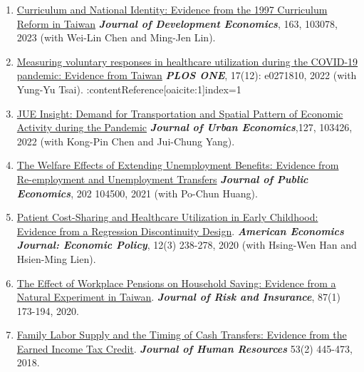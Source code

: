 \documentclass[10pt,letterpaper]{article}
\begin{document}
\begin{enumerate}
\item
\href{https://www.dropbox.com/s/lz3pqw0rozyn68r/knowing_taiwan_ver_2017_08_tzu_ting_v58.pdf?dl=0}{Curriculum and National Identity: Evidence from the 1997 Curriculum Reform in Taiwan} \textit{\textbf{Journal of Development Economics}}, 163, 103078, 2023 (with Wei-Lin Chen and Ming-Jen Lin).

\item
\href{https://doi.org/10.1371/journal.pone.0271810}{Measuring voluntary responses in healthcare utilization during the COVID-19 pandemic: Evidence from Taiwan}  \textit{\textbf{PLOS ONE}}, 17(12): e0271810, 2022 (with Yung-Yu Tsai). :contentReference[oaicite:1]{index=1}


\item
\href{https://www.dropbox.com/s/etfzl98k6d83ef5/Spontaneous_Population_Mobility_v23.pdf?dl=0}{JUE Insight: Demand for Transportation and Spatial Pattern of Economic Activity during the Pandemic} \textit{\textbf{Journal of Urban Economics}},127, 103426, 2022 (with Kong-Pin Chen and Jui-Chung Yang).

\item
\href{https://www.dropbox.com/s/4bmmsvl2mko0thu/Optimal_UI_Tzu_Ting_v142.pdf?dl=0}{The Welfare Effects of Extending Unemployment Benefits: Evidence from Re-­employment and Unemployment Transfers} \textit{\textbf{Journal of Public Economics}}, 202 104500, 2021 (with Po-Chun Huang).

\item \href{https://www.dropbox.com/s/pe5n9a74avtwk6v/Children_copay_v176_parametric.pdf?dl=0}{Patient Cost-Sharing and Healthcare Utilization in Early Childhood: Evidence from a Regression Discontinuity Design}.
\textit{\textbf{American Economics Journal: Economic Policy}}, 12(3) 238-278, 2020 (with Hsing-Wen Han and Hsien-Ming Lien).

\item
\href{https://www.dropbox.com/s/i792d6jutss65b2/Proposal_pension_saving_JRI_v91_final.pdf?dl=0}{The Effect of Workplace Pensions on Household Saving: Evidence from a Natural Experiment in Taiwan}.
\textit{\textbf{Journal of Risk and Insurance}}, 87(1) 173-194, 2020.

\item \href{http://jhr.uwpress.org/content/early/2017/03/01/jhr.53.2.0115-6857R1.abstract}{Family Labor Supply and the Timing of Cash Transfers: Evidence from the Earned Income Tax Credit}.
\textit{\textbf{Journal of Human Resources}} 53(2) 445-473, 2018.


\end{enumerate}
\end{document}
